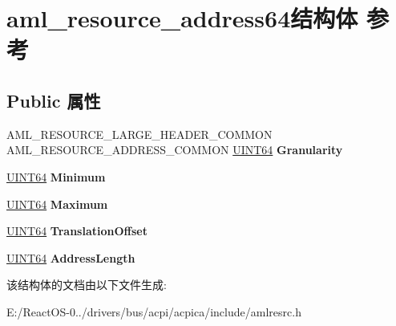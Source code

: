 \hypertarget{structaml__resource__address64}{}\section{aml\+\_\+resource\+\_\+address64结构体 参考}
\label{structaml__resource__address64}
\subsection*{Public 属性}
\begin{DoxyCompactItemize}
\item 
\mbox{\label{structaml__resource__address64_a4c731aedc136a23b9e807cfa37085556}} 
A\+M\+L\+\_\+\+R\+E\+S\+O\+U\+R\+C\+E\+\_\+\+L\+A\+R\+G\+E\+\_\+\+H\+E\+A\+D\+E\+R\+\_\+\+C\+O\+M\+M\+ON A\+M\+L\+\_\+\+R\+E\+S\+O\+U\+R\+C\+E\+\_\+\+A\+D\+D\+R\+E\+S\+S\+\_\+\+C\+O\+M\+M\+ON \hyperlink{_processor_bind_8h_a57be03562867144161c1bfee95ca8f7c}{U\+I\+N\+T64} {\bfseries Granularity}
\item 
\mbox{\label{structaml__resource__address64_a978be89483aedcf657da15c8ebf0379a}} 
\hyperlink{_processor_bind_8h_a57be03562867144161c1bfee95ca8f7c}{U\+I\+N\+T64} {\bfseries Minimum}
\item 
\mbox{\label{structaml__resource__address64_af19cd0ccf478fddc4a3bc49b51889009}} 
\hyperlink{_processor_bind_8h_a57be03562867144161c1bfee95ca8f7c}{U\+I\+N\+T64} {\bfseries Maximum}
\item 
\mbox{\label{structaml__resource__address64_a9bfdb7bdc1d80b5814f1786e3154c070}} 
\hyperlink{_processor_bind_8h_a57be03562867144161c1bfee95ca8f7c}{U\+I\+N\+T64} {\bfseries Translation\+Offset}
\item 
\mbox{\label{structaml__resource__address64_ab3463b1f9269c5210574e461768e27c9}} 
\hyperlink{_processor_bind_8h_a57be03562867144161c1bfee95ca8f7c}{U\+I\+N\+T64} {\bfseries Address\+Length}
\end{DoxyCompactItemize}


该结构体的文档由以下文件生成\+:\begin{DoxyCompactItemize}
\item 
E\+:/\+React\+O\+S-\/0../drivers/bus/acpi/acpica/include/amlresrc.\+h\end{DoxyCompactItemize}

